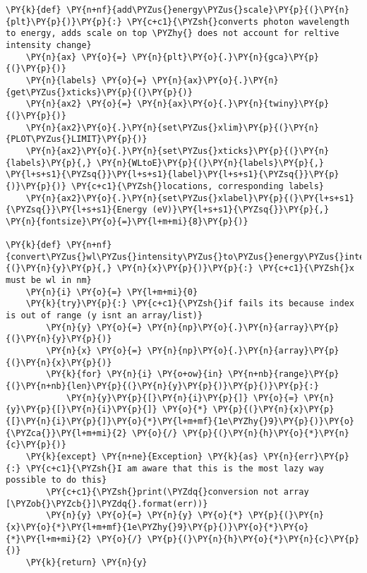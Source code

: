 \begin{tcolorbox}[breakable, size=fbox, boxrule=1pt, pad at break*=1mm,colback=cellbackground, colframe=cellborder]
\begin{Verbatim}[commandchars=\\\{\}]
\PY{k}{def} \PY{n+nf}{add\PYZus{}energy\PYZus{}scale}\PY{p}{(}\PY{n}{plt}\PY{p}{)}\PY{p}{:} \PY{c+c1}{\PYZsh{}converts photon wavelength to energy, adds scale on top \PYZhy{} does not account for reltive intensity change}
    \PY{n}{ax} \PY{o}{=} \PY{n}{plt}\PY{o}{.}\PY{n}{gca}\PY{p}{(}\PY{p}{)}
    \PY{n}{labels} \PY{o}{=} \PY{n}{ax}\PY{o}{.}\PY{n}{get\PYZus{}xticks}\PY{p}{(}\PY{p}{)}
    \PY{n}{ax2} \PY{o}{=} \PY{n}{ax}\PY{o}{.}\PY{n}{twiny}\PY{p}{(}\PY{p}{)}
    \PY{n}{ax2}\PY{o}{.}\PY{n}{set\PYZus{}xlim}\PY{p}{(}\PY{n}{PLOT\PYZus{}LIMIT}\PY{p}{)}
    \PY{n}{ax2}\PY{o}{.}\PY{n}{set\PYZus{}xticks}\PY{p}{(}\PY{n}{labels}\PY{p}{,} \PY{n}{WLtoE}\PY{p}{(}\PY{n}{labels}\PY{p}{,} \PY{l+s+s1}{\PYZsq{}}\PY{l+s+s1}{label}\PY{l+s+s1}{\PYZsq{}}\PY{p}{)}\PY{p}{)} \PY{c+c1}{\PYZsh{}locations, corresponding labels}
    \PY{n}{ax2}\PY{o}{.}\PY{n}{set\PYZus{}xlabel}\PY{p}{(}\PY{l+s+s1}{\PYZsq{}}\PY{l+s+s1}{Energy (eV)}\PY{l+s+s1}{\PYZsq{}}\PY{p}{,} \PY{n}{fontsize}\PY{o}{=}\PY{l+m+mi}{8}\PY{p}{)}

\PY{k}{def} \PY{n+nf}{convert\PYZus{}wl\PYZus{}intensity\PYZus{}to\PYZus{}energy\PYZus{}intensity}\PY{p}{(}\PY{n}{y}\PY{p}{,} \PY{n}{x}\PY{p}{)}\PY{p}{:} \PY{c+c1}{\PYZsh{}x must be wl in nm}
    \PY{n}{i} \PY{o}{=} \PY{l+m+mi}{0}
    \PY{k}{try}\PY{p}{:} \PY{c+c1}{\PYZsh{}if fails its because index is out of range (y isnt an array/list)}
        \PY{n}{y} \PY{o}{=} \PY{n}{np}\PY{o}{.}\PY{n}{array}\PY{p}{(}\PY{n}{y}\PY{p}{)}
        \PY{n}{x} \PY{o}{=} \PY{n}{np}\PY{o}{.}\PY{n}{array}\PY{p}{(}\PY{n}{x}\PY{p}{)}
        \PY{k}{for} \PY{n}{i} \PY{o+ow}{in} \PY{n+nb}{range}\PY{p}{(}\PY{n+nb}{len}\PY{p}{(}\PY{n}{y}\PY{p}{)}\PY{p}{)}\PY{p}{:}
            \PY{n}{y}\PY{p}{[}\PY{n}{i}\PY{p}{]} \PY{o}{=} \PY{n}{y}\PY{p}{[}\PY{n}{i}\PY{p}{]} \PY{o}{*} \PY{p}{(}\PY{n}{x}\PY{p}{[}\PY{n}{i}\PY{p}{]}\PY{o}{*}\PY{l+m+mf}{1e\PYZhy{}9}\PY{p}{)}\PY{o}{\PYZca{}}\PY{l+m+mi}{2} \PY{o}{/} \PY{p}{(}\PY{n}{h}\PY{o}{*}\PY{n}{c}\PY{p}{)}
    \PY{k}{except} \PY{n+ne}{Exception} \PY{k}{as} \PY{n}{err}\PY{p}{:} \PY{c+c1}{\PYZsh{}I am aware that this is the most lazy way possible to do this}
        \PY{c+c1}{\PYZsh{}print(\PYZdq{}conversion not array [\PYZob{}\PYZcb{}]\PYZdq{}.format(err))}
        \PY{n}{y} \PY{o}{=} \PY{n}{y} \PY{o}{*} \PY{p}{(}\PY{n}{x}\PY{o}{*}\PY{l+m+mf}{1e\PYZhy{}9}\PY{p}{)}\PY{o}{*}\PY{o}{*}\PY{l+m+mi}{2} \PY{o}{/} \PY{p}{(}\PY{n}{h}\PY{o}{*}\PY{n}{c}\PY{p}{)}
    \PY{k}{return} \PY{n}{y}


\end{Verbatim}
\end{tcolorbox}
